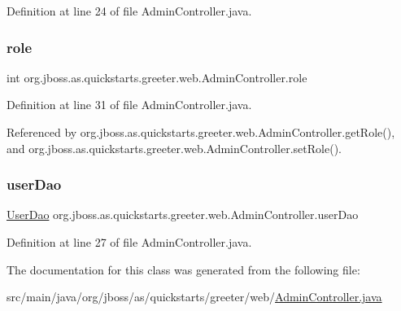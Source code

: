 Definition at line 24 of file Admin\+Controller.\+java.

\mbox{\label{classorg_1_1jboss_1_1as_1_1quickstarts_1_1greeter_1_1web_1_1_admin_controller_ad54ca6c54ccdb72464120fa054c40664}} 
\subsubsection{\texorpdfstring{role}{role}}
{\footnotesize\ttfamily int org.\+jboss.\+as.\+quickstarts.\+greeter.\+web.\+Admin\+Controller.\+role\hspace{0.3cm}{\ttfamily [private]}}



Definition at line 31 of file Admin\+Controller.\+java.



Referenced by org.\+jboss.\+as.\+quickstarts.\+greeter.\+web.\+Admin\+Controller.\+get\+Role(), and org.\+jboss.\+as.\+quickstarts.\+greeter.\+web.\+Admin\+Controller.\+set\+Role().

\mbox{\label{classorg_1_1jboss_1_1as_1_1quickstarts_1_1greeter_1_1web_1_1_admin_controller_a2acf35dc7505826ddc0e7c5256618248}} 
\subsubsection{\texorpdfstring{user\+Dao}{userDao}}
{\footnotesize\ttfamily \hyperlink{interfaceorg_1_1jboss_1_1as_1_1quickstarts_1_1greeter_1_1domain_1_1_user_dao}{User\+Dao} org.\+jboss.\+as.\+quickstarts.\+greeter.\+web.\+Admin\+Controller.\+user\+Dao\hspace{0.3cm}{\ttfamily [private]}}



Definition at line 27 of file Admin\+Controller.\+java.



The documentation for this class was generated from the following file\+:\begin{DoxyCompactItemize}
\item 
src/main/java/org/jboss/as/quickstarts/greeter/web/\hyperlink{_admin_controller_8java}{Admin\+Controller.\+java}\end{DoxyCompactItemize}
